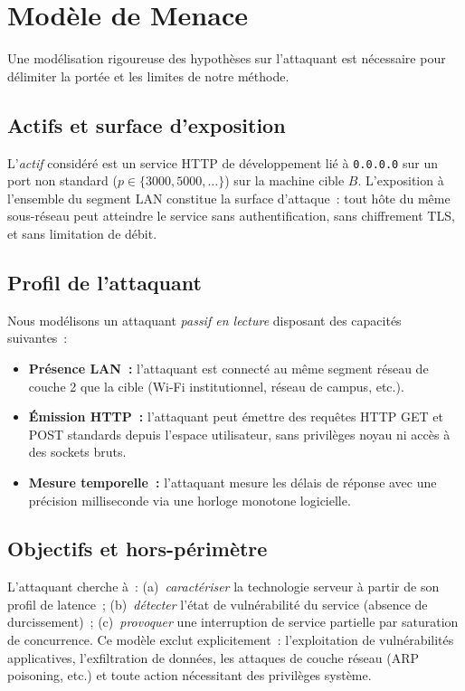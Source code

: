 \documentclass[10pt,conference,compsoc]{IEEEtran}
\begin{document}
\section{Modèle de Menace}
\label{sec:threat_model}

Une modélisation rigoureuse des hypothèses sur l'attaquant est
nécessaire pour délimiter la portée et les limites de notre méthode.

\subsection{Actifs et surface d'exposition}
L'\textit{actif} considéré est un service HTTP de développement lié à
\texttt{0.0.0.0} sur un port non standard ($p \in \{3000, 5000, \ldots\}$)
sur la machine cible $B$. L'exposition à l'ensemble du segment LAN
constitue la surface d'attaque~: tout hôte du même sous-réseau peut
atteindre le service sans authentification, sans chiffrement TLS, et
sans limitation de débit.

\subsection{Profil de l'attaquant}
Nous modélisons un attaquant \textit{passif en lecture} disposant des
capacités suivantes~:
\begin{itemize}
    \item \textbf{Présence LAN~:} l'attaquant est connecté au même
      segment réseau de couche 2 que la cible (Wi-Fi institutionnel,
      réseau de campus, etc.).
    \item \textbf{Émission HTTP~:} l'attaquant peut émettre des requêtes
      HTTP GET et POST standards depuis l'espace utilisateur, sans
      privilèges noyau ni accès à des sockets bruts.
    \item \textbf{Mesure temporelle~:} l'attaquant mesure les délais de
      réponse avec une précision milliseconde via une horloge monotone
      logicielle.
\end{itemize}

\subsection{Objectifs et hors-périmètre}
L'attaquant cherche à~: (a)~\textit{caractériser} la technologie
serveur à partir de son profil de latence~; (b)~\textit{détecter}
l'état de vulnérabilité du service (absence de durcissement)~;
(c)~\textit{provoquer} une interruption de service partielle par
saturation de concurrence. Ce modèle exclut explicitement~:
l'exploitation de vulnérabilités applicatives, l'exfiltration de
données, les attaques de couche réseau (ARP poisoning, etc.) et
toute action nécessitant des privilèges système.
\end{document}
